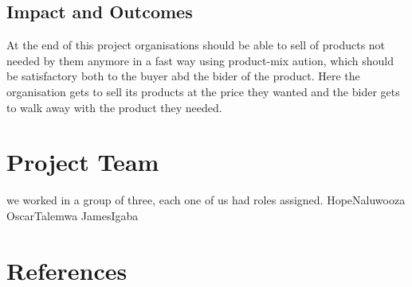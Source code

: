 \documentclass[11pt]{article} %
\begin{document}
\subsection{Impact and Outcomes}
At the end of this project organisations should be able to sell of products not needed by them anymore in a fast way using product-mix aution, which should be satisfactory both to the buyer abd the bider of the product. Here the organisation gets to sell its products at the price they wanted and the bider gets to walk away with the product they needed.
\section{Project Team}
we worked in a group of three, each one of us had roles assigned.
HopeNaluwooza
OscarTalemwa
JamesIgaba
\section{References}
\end{document}
